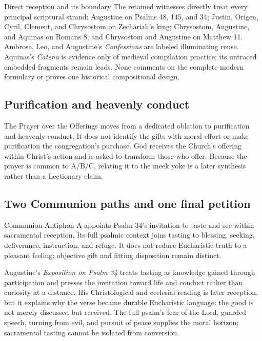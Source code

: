 \begin{deepstudy}
\begin{studybox}{Direct reception and its boundary}
The retained witnesses directly treat every principal scriptural strand: Augustine on Psalms 48, 145, and 34; Justin, Origen, Cyril, Clement, and Chrysostom on Zechariah's king; Chrysostom, Augustine, and Aquinas on Romans 8; and Chrysostom and Augustine on Matthew 11. Ambrose, Leo, and Augustine's \emph{Confessions} are labeled illuminating reuse. Aquinas's \emph{Catena} is evidence only of medieval compilation practice; its untraced embedded fragments remain leads. None comments on the complete modern formulary or proves one historical compositional design.
\end{studybox}

\subsection*{Purification and heavenly conduct\enspace{}}

The Prayer over the Offerings moves from a dedicated oblation to purification and heavenly conduct. It does not identify the gifts with moral effort or make purification the congregation's purchase. God receives the Church's offering within Christ's action and is asked to transform those who offer. Because the prayer is common to A/B/C, relating it to the meek yoke is a later synthesis rather than a Lectionary claim.

\subsection*{Two Communion paths and one final petition\enspace{}}

Communion Antiphon A appoints Psalm 34's invitation to taste and see within sacramental reception. Its full psalmic context joins tasting to blessing, seeking, deliverance, instruction, and refuge. It does not reduce Eucharistic truth to a pleasant feeling; objective gift and fitting disposition remain distinct.

Augustine's \emph{Exposition on Psalm 34} treats tasting as knowledge gained through participation and presses the invitation toward life and conduct rather than curiosity at a distance. His Christological and ecclesial reading is later reception, but it explains why the verse became durable Eucharistic language: the good is not merely discussed but received. The full psalm's fear of the Lord, guarded speech, turning from evil, and pursuit of peace supplies the moral horizon; sacramental tasting cannot be isolated from conversion.


\end{deepstudy}
